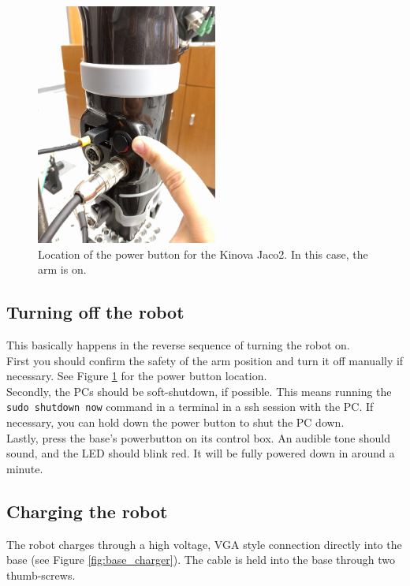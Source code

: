 \begin{figure}[h!] 
  \centering
  \includegraphics[height=300px]{figures/arm_power.jpg}
  \caption{Location of the power button for the Kinova Jaco2. In this case, the arm is on.}
  \label{fig:arm_power}
\end{figure}

\subsection{Turning off the robot}
This basically happens in the reverse sequence of turning the robot on. \\

First you should confirm the safety of the arm position and turn it off manually if necessary. See Figure \ref{fig:arm_power} for the power button location. \\

Secondly, the PCs should be soft-shutdown, if possible. This means running the \texttt{sudo shutdown now} command in a terminal in a ssh session with the PC. If necessary, you can hold down the power button to shut the PC down. \\

Lastly, press the base's powerbutton on its control box. An audible tone should sound, and the LED should blink red. It will be fully powered down in around a minute.

\subsection{Charging the robot}\label{sec:charging_robot}
The robot charges through a high voltage, VGA style connection directly into the base (see Figure \ref{fig:base_charger}). The cable is held into the base through two thumb-screws.

